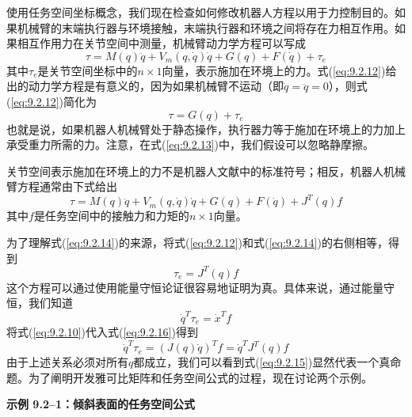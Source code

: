 \documentclass[12pt,a4paper]{ctexart}
\begin{document}
使用任务空间坐标概念，我们现在检查如何修改机器人方程以用于力控制目的。如果机械臂的末端执行器与环境接触，末端执行器和环境之间将存在力相互作用。如果相互作用力在关节空间中测量，机械臂动力学方程可以写成
\begin{equation}\label{eq:9.2.12}
\tau = M(q)\ddot{q} + V_m(q, \dot{q})\dot{q} + G(q) + F(\dot{q}) + \tau_e
\end{equation}
其中$\tau_e$是关节空间坐标中的$n \times 1$向量，表示施加在环境上的力。式(\ref{eq:9.2.12})给出的动力学方程是有意义的，因为如果机械臂不运动（即$\dot{q} = \ddot{q} = 0$），则式(\ref{eq:9.2.12})简化为
\begin{equation}\label{eq:9.2.13}
\tau = G(q) + \tau_e
\end{equation}
也就是说，如果机器人机械臂处于静态操作，执行器力等于施加在环境上的力加上承受重力所需的力。注意，在式(\ref{eq:9.2.13})中，我们假设可以忽略静摩擦。

关节空间表示施加在环境上的力不是机器人文献中的标准符号；相反，机器人机械臂方程通常由下式给出
\begin{equation}\label{eq:9.2.14}
\tau = M(q)\ddot{q} + V_m(q, \dot{q})\dot{q} + G(q) + F(\dot{q}) + J^T(q)f
\end{equation}
其中$f$是任务空间中的接触力和力矩的$n \times 1$向量。

为了理解式(\ref{eq:9.2.14})的来源，将式(\ref{eq:9.2.12})和式(\ref{eq:9.2.14})的右侧相等，得到
\begin{equation}\label{eq:9.2.15}
\tau_e = J^T(q)f
\end{equation}
这个方程可以通过使用能量守恒论证很容易地证明为真。具体来说，通过能量守恒，我们知道
\begin{equation}\label{eq:9.2.16}
\dot{q}^T \tau_e = \dot{x}^T f
\end{equation}
将式(\ref{eq:9.2.10})代入式(\ref{eq:9.2.16})得到
\[
\dot{q}^T \tau_e = (J(q)\dot{q})^T f = \dot{q}^T J^T(q)f
\]
由于上述关系必须对所有$q$都成立，我们可以看到式(\ref{eq:9.2.15})显然代表一个真命题。为了阐明开发雅可比矩阵和任务空间公式的过程，现在讨论两个示例。

\textbf{示例 9.2--1：倾斜表面的任务空间公式}
\end{document}
